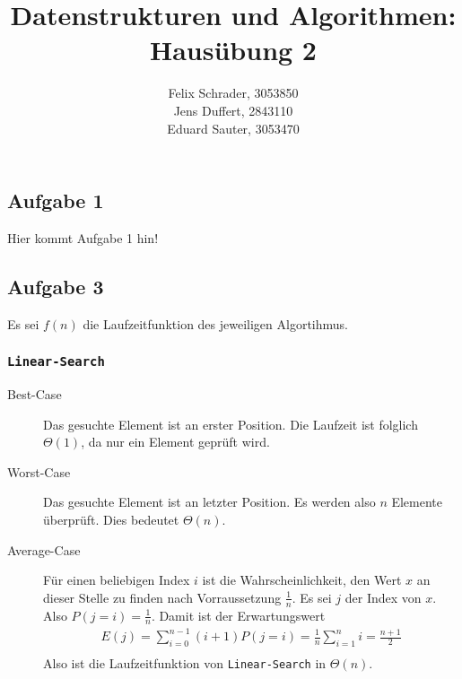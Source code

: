 \documentclass[11pt]{article}
\author{
  Felix Schrader, 3053850 \\ 
  Jens Duffert, 2843110 \\
  Eduard Sauter, 3053470
}
\title{Datenstrukturen und Algorithmen: Haus\"ubung 2}
\begin{document}
\maketitle

\subsection*{Aufgabe 1}
Hier kommt Aufgabe 1 hin!

\subsection*{Aufgabe 3}
%
Es sei $f(n)$ die Laufzeitfunktion des jeweiligen Algortihmus.
  \subsubsection*{\texttt{Linear-Search}}
    \begin{description}
      \item[Best-Case] Das gesuchte Element ist an erster Position. Die Laufzeit
        ist folglich $\Theta(1)$, da nur ein Element gepr\"uft wird.

      \item[Worst-Case] Das gesuchte Element ist an letzter Position. Es werden
        also $n$ Elemente \"uberpr\"uft. Dies bedeutet $\Theta(n)$.
        
      \item[Average-Case] 
        F\"ur einen beliebigen Index $i$ ist die Wahrscheinlichkeit, den 
        Wert $x$ an dieser Stelle zu finden nach Vorraussetzung $\frac{1}{n}$.
        Es sei $j$ der Index von $x$.  Also $P(j=i) = \frac{1}{n}$. 
        Damit ist der Erwartungswert 
        \begin{align*}
          E(j)  = \sum_{i=0}^{n-1} (i + 1) P(j=i) = \frac{1}{n} \sum_{i=1}^{n} i 
                                                  = \frac{n + 1}{2} \\
        \end{align*}
        Also ist die Laufzeitfunktion von \texttt{Linear-Search} in 
        $\Theta(n)$.

    \end{description}
\end{document}
